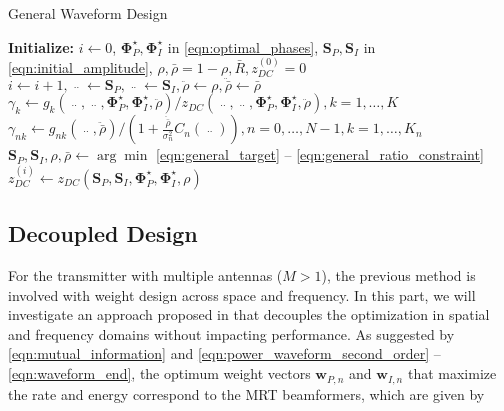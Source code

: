\begin{algorithm}
  \caption{General Waveform Design}
  \label{alg:general}
  \begin{algorithmic}[1]
    \State \textbf{Initialize:} $i \leftarrow 0$, ${\mathbf{\Phi }}_P^ \star ,{\mathbf{\Phi }}_I^ \star $ in \eqref{eqn:optimal_phases}, ${{{\mathbf{S}}_P},{{\mathbf{S}}_I}}$ in \eqref{eqn:initial_amplitude}, $\rho ,\bar \rho  = 1 - \rho ,\bar R,z_{DC}^{(0)} = 0$
    \Repeat
      \State $i \leftarrow i + 1,\mathop {{{\mathbf{S}}_P}}\limits^{..}  \leftarrow {{\mathbf{S}}_P},\mathop {{{\mathbf{S}}_I}}\limits^{..}  \leftarrow {{\mathbf{S}}_I},\ddot \rho  \leftarrow \rho ,\ddot{\bar{\rho}}  \leftarrow \bar \rho $
      \State ${\gamma _k} \leftarrow {g_k}\left( {\mathop {{{\mathbf{S}}_P}}\limits^{..} ,\mathop {{{\mathbf{S}}_I}}\limits^{..} ,{\mathbf{\Phi }}_P^ \star ,{\mathbf{\Phi }}_I^ \star ,\ddot \rho } \right)/{z_{DC}}\left( {\mathop {{{\mathbf{S}}_P}}\limits^{..} ,\mathop {{{\mathbf{S}}_I}}\limits^{..} ,{\mathbf{\Phi }}_P^ \star ,{\mathbf{\Phi }}_I^ \star ,\ddot \rho } \right),k = 1, \ldots ,K$
      \State ${\gamma _{nk}} \leftarrow {g_{nk}}\left( {\mathop {{{\mathbf{S}}_I}}\limits^{..} ,\ddot{\bar{\rho}} } \right)/\left( {1 + \frac{{\ddot{\bar{\rho}}}}{{\sigma _n^2}}{C_n}\left( {\mathop {{{\mathbf{S}}_I}}\limits^{..} } \right)} \right),n = 0, \ldots ,N - 1,k = 1, \ldots ,{K_n}$
      \State ${{\mathbf{S}}_P},{{\mathbf{S}}_I},\rho ,\bar \rho  \leftarrow \arg \min $ \eqref{eqn:general_target} -- \eqref{eqn:general_ratio_constraint}
      \State $z_{DC}^{(i)} \leftarrow {z_{DC}}\left( {{{\mathbf{S}}_P},{{\mathbf{S}}_I},{\mathbf{\Phi }}_P^ \star ,{\mathbf{\Phi }}_I^ \star ,\rho } \right)$
  \end{algorithmic}
\end{algorithm}



\subsection{Decoupled Design}\label{sec:decoupled-design}
For the transmitter with multiple antennas ($M > 1$), the previous method is involved with weight design across space and frequency. In this part, we will investigate an approach proposed in \cite{Clerckx2018} that decouples the optimization in spatial and frequency domains without impacting performance. As suggested by \eqref{eqn:mutual_information} and \eqref{eqn:power_waveform_second_order} -- \eqref{eqn:waveform_end}, the optimum weight vectors ${{\mathbf{w}}_{P,n}}$ and ${{\mathbf{w}}_{I,n}}$ that maximize the rate and energy correspond to the MRT beamformers, which are given by

